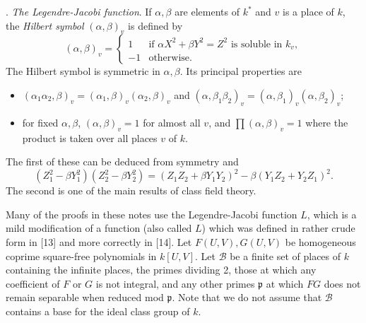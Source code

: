 \documentclass[12pt]{article}
\def\fp{{\mathfrak p}}
\def\ga{{\alpha}}
\def\gb{{\beta}}
\def\sB{{\mathcal B}}
\begin{document}
\newpage

. \emph{The Legendre-Jacobi function}. \newline
If $\ga,\gb$ are elements of $k^*$ and $v$ is a
place of $k$, the \emph{Hilbert symbol} $(\ga,\gb)_v$ is defined by
\[ (\ga,\gb)_v= \begin{cases}
1 & \text{if $\ga X^2+\gb Y^2=Z^2$ is soluble in $k_v$}, \\
-1 & \text{otherwise}.
\end{cases} \]
The Hilbert symbol is symmetric in $\ga,\gb$. Its principal properties are
\begin{itemize}
\item $(\ga_1\ga_2,\gb)_v=(\ga_1,\gb)_v(\ga_2,\gb)_v$ and $(\ga,\gb_1\gb_2)_v
=(\ga,\gb_1)_v(\ga,\gb_2)_v$;
\item for fixed $\ga,\gb$, $(\ga,\gb)_v=1$ for almost all $v$, and
$\prod(\ga,\gb)_v=1$ where the product is taken over all places $v$ of $k$.
\end{itemize}
The first of these can be deduced from symmetry and
\[ (Z_1^2-\gb Y_1^2)(Z_2^2-\gb Y_2^2)=(Z_1Z_2+\gb Y_1Y_2)^2-\gb(Y_1Z_2+
Y_2Z_1)^2. \]
The second is one of the main results of class field theory.

Many of the proofs in these notes use the Legendre-Jacobi function $L$,
which is a mild modification of a function (also called $L$) which was
defined in rather crude form in [13] and more correctly in [14]. Let
$F(U,V),G(U,V)$ be homogeneous coprime square-free polynomials in $k[U,V]$.
Let $\sB$ be a finite set of places of $k$ containing the infinite places,
the primes dividing 2, those at which any coefficient of $F$ or $G$ is not
integral, and any other primes $\fp$ at which $FG$ does not remain separable
when reduced mod $\fp$. Note that we do not assume that $\sB$ contains a base
for the ideal class group of $k$.
\end{document}
